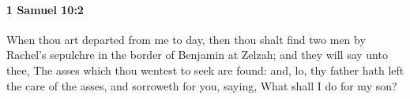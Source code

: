 
		\paragraph{1 Samuel 10:2} %
			\label{1SAMUEL-10-2}

			When thou art departed from me to day, then thou shalt find two men by Rachel’s sepulchre in the border of Benjamin at Zelzah; and they will say unto thee, The asses which thou wentest to seek are found: and, lo, thy father hath left the care of the asses, and sorroweth for you, saying, What shall I do for my son?


